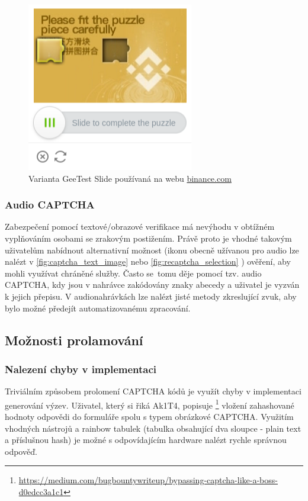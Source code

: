 \documentclass[
  field=ainfp,
  master=true,
  biblatex,
  sourcecodes=false,
  theorems=false,
  glossaries,
  index
]{kidiplom}
\begin{document}
\begin{figure}[H]
  \centering
  \includegraphics[scale=0.7]{images/geetest.png}
  \caption{Varianta GeeTest Slide používaná na webu \url{binance.com}}
  \label{fig:captcha_geetest}
\end{figure}

\subsubsection*{Audio CAPTCHA}
Zabezpečení pomocí textové/obrazové verifikace má nevýhodu v obtížném vyplňováním osobami se zrakovým postižením. Právě proto je vhodné takovým uživatelům nabídnout alternativní možnost (ikonu obecně užívanou pro audio lze nalézt v \ref{fig:captcha_text_image} nebo \ref{fig:recaptcha_selection} ) ověření, aby mohli využívat chráněné služby. Často se~tomu děje pomocí tzv. audio CAPTCHA, kdy jsou v nahrávce zakódovány znaky abecedy a uživatel je vyzván k jejich přepisu. V audionahrávkách lze nalézt jisté metody zkreslující zvuk, aby bylo možné předejít automatizovanému zpracování.

\subsection{Možnosti prolamování}
\subsubsection*{Nalezení chyby v implementaci}
Triviálním způsobem prolomení CAPTCHA kódů je využít chyby v implementaci generování výzev. Uživatel, který si řiká Ak1T4, popisuje \footnote{\url{https://medium.com/bugbountywriteup/bypassing-captcha-like-a-boss-d0edcc3a1c1}} vložení zahashované hodnoty odpovědi do formuláře spolu s typem obrázkové CAPTCHA. Využitím vhodných nástrojů a rainbow tabulek (tabulka obsahující dva sloupce - plain text a příslušnou hash) je možné s odpovídajícím hardware nalézt rychle správnou odpověď.
\end{document}
